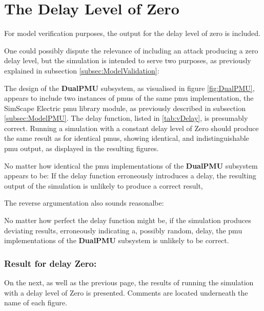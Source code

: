 \section{The Delay Level of Zero}
For model verification purposes, the output for the delay level of zero is included.

One could possibly dispute the relevance of including an attack producing a zero delay level, but the simulation is intended to serve two purposes, as previously explained in subsection \ref{subsec:ModelValidation}:

\begin{enumerate}
 The design of the \textbf{DualPMU}  subsystem, as visualised in figure \ref{fig:DualPMU}, appears to include two instances of \acrlong{pmu}s of the same \acrshort{pmu} implementation, the SimScape Electric \acrshort{pmu} library module, as previously described in subsection \ref{subsec:ModelPMU}.  
 The delay function, listed in \ref{tab:vDelay}, is presumably correct. Running a simulation with a constant delay level of Zero should produce the same result as for identical \acrfull{pmu}s, showing identical, and indistinguishable \acrshort{pmu} output, as displayed in the resulting figures.
\end{enumerate}

No matter how identical the \acrshort{pmu} implementations of the  \textbf{DualPMU}  subsystem appears to be: If the delay function erroneously introduces a delay, the resulting output of the simulation is unlikely to produce a correct result, 

The reverse argumentation also sounds reasonalbe:

No matter how perfect the delay function might be, if the simulation produces deviating results, erroneously indicating a, possibly random, delay, the \acrshort{pmu} implementations of the  \textbf{DualPMU}  subsystem  is unlikely to be correct. 

\subsubsection{Result for delay Zero:}

On the next, as well as the previous page, the results of running the simulation with a delay level of Zero is presented. Comments are located underneath the name of each figure.


